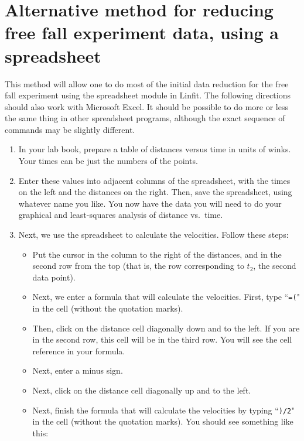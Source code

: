 \section*{Alternative method for reducing free fall experiment data,
using a spreadsheet}

This method will allow one to do most of the initial data reduction for
the free fall experiment using the spreadsheet module in Linfit.  The
following directions should also work with Microsoft Excel.  It should
be possible to do more or less the same thing in other spreadsheet
programs, although the exact sequence of commands may be slightly
different.

\begin{enumerate}

\item In your lab book, prepare a table of distances
versus time in units of winks.  Your times can be just the numbers
of the points.

\item Enter these values into adjacent columns of the spreadsheet, with
the times on the left and the distances on the right.  Then, save the
spreadsheet, using whatever name you like.   You now have the data you
will need to do your graphical and
least-squares analysis of distance vs.\ time.


\item  Next, we use the
spreadsheet to calculate the velocities.  Follow these steps:
%
\begin{itemize}
\item  Put the cursor in the column to the right of the distances,
and in the second row from the top (that is, the row corresponding
to $t_2$, the second data point).

\item  Next, we enter a formula that will calculate the velocities.
First, type  ``{\tt =(}"  in the cell (without the quotation marks).

\item  Then, click on the distance cell diagonally down and to the
left.  If you are in the second row, this cell will be in the third
row.  You will see the cell reference in your formula.

\item  Next, enter a minus sign.

\item  Next, click on the distance cell diagonally up and to the left.

\item  Next, finish the formula that will calculate the velocities by
typing  ``{\tt )/2}"  in the cell (without the quotation marks).
You should see something like this:


\end{itemize}
\end{enumerate}

